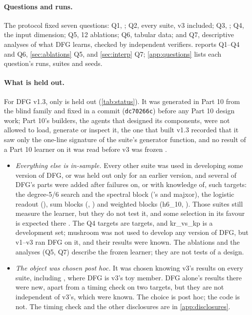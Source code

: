 \paragraph{Questions and runs.} The protocol fixed seven questions: Q1, ; Q2, every suite, v3 included; Q3, ; Q4, the input dimension; Q5, 12 ablations; Q6, tabular data; and Q7, descriptive analyses of what DFG learns, checked by independent verifiers.  reports Q1--Q4 and Q6, \cref{sec:ablations} Q5, and \cref{sec:interp} Q7; \cref{app:questions} lists each question's runs, suites and seeds.

\paragraph{What is held out.} For DFG v1.3, only  is held out (\cref{tab:status}). It was generated in Part 10 from the blind family and fixed in a commit (\texttt{dc70266c}) before any Part 10 design work; Part 10's builders, the agents that designed its components, were not allowed to load, generate or inspect it, the one that built v1.3 recorded that it saw only the one-line signature of the suite's generator function, and no result of a Part 10 learner on it was read before v3 was frozen \cite{portfoliolearner2026}.
\begin{itemize}
\item \emph{Everything else is in-sample.} Every other suite was used in developing some version of DFG, or was held out only for an earlier version, and several of DFG's parts were added after failures on, or with knowledge of, such targets: the degree-5/6 search and the spectral block ('s  and majxor), the logistic readout (), sum blocks (, ) and weighted blocks (h6\_10, ). Those suites still measure the learner, but they do not test it, and some selection in its favour is expected there . The Q4 targets are  targets, and kr\_vs\_kp is a development set; mushroom was not used to develop any version of DFG, but v1--v3 ran DFG on it, and their results were known. The ablations and the analyses (Q5, Q7) describe the frozen learner; they are not tests of a design.
\item \emph{The object was chosen post hoc.} It was chosen knowing v3's results on every suite, including , where DFG is v3's toy member. DFG alone's results there were new, apart from a timing check on two targets, but they are not independent of v3's, which were known. The choice is post hoc; the code is not. The timing check and the other disclosures are in \cref{app:disclosures}.
\end{itemize}
